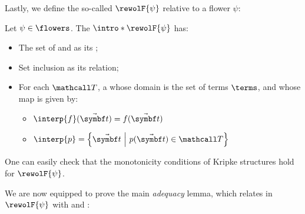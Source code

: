 \begin{scope}
Lastly, we define the so-called \emph{}
$\rewolF{\psi}$ relative to a flower $\psi$:

\begin{definition}
  Let $\psi \in \flowers$. The 
  $\intro*\rewolF{\psi}$ has:
  \begin{itemize}
    \item The set of \consistent{\psi} and \complete{\psi}  as its ;
    \item Set inclusion as its  relation;
    \item For each  $\tT$, a  whose domain is the set of
    terms $\terms$, and whose  map is given by:
      \begin{itemize}
        \item $\interp{f}(\tvec{t}) = f(\tvec{t})$
        \item $\interp{p} = \compr{\tvec{t}}{p(\tvec{t}) \in \tT}$
      \end{itemize}
  \end{itemize}
  One can easily check that the monotonicity conditions of Kripke structures
  hold for $\rewolF{\psi}$.
\end{definition}

We are now equipped to prove the main \emph{adequacy} lemma, which relates
 in $\rewolF{\psi}$ with \consistency{\psi} and \completeness{\psi}:

\begin{lemma}[Adequacy]


\end{lemma}
\end{scope}
